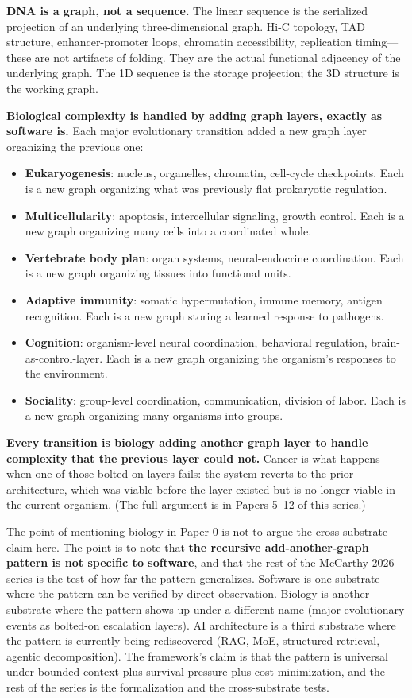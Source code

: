\documentclass[11pt]{article}
\begin{document}
\textbf{DNA is a graph, not a sequence.} The linear sequence is the serialized projection of an underlying three-dimensional graph. Hi-C topology, TAD structure, enhancer-promoter loops, chromatin accessibility, replication timing---these are not artifacts of folding. They are the actual functional adjacency of the underlying graph. The 1D sequence is the storage projection; the 3D structure is the working graph.

\textbf{Biological complexity is handled by adding graph layers, exactly as software is.} Each major evolutionary transition added a new graph layer organizing the previous one:

\begin{itemize}[leftmargin=*]
\item \textbf{Eukaryogenesis}: nucleus, organelles, chromatin, cell-cycle checkpoints. Each is a new graph organizing what was previously flat prokaryotic regulation.
\item \textbf{Multicellularity}: apoptosis, intercellular signaling, growth control. Each is a new graph organizing many cells into a coordinated whole.
\item \textbf{Vertebrate body plan}: organ systems, neural-endocrine coordination. Each is a new graph organizing tissues into functional units.
\item \textbf{Adaptive immunity}: somatic hypermutation, immune memory, antigen recognition. Each is a new graph storing a learned response to pathogens.
\item \textbf{Cognition}: organism-level neural coordination, behavioral regulation, brain-as-control-layer. Each is a new graph organizing the organism's responses to the environment.
\item \textbf{Sociality}: group-level coordination, communication, division of labor. Each is a new graph organizing many organisms into groups.
\end{itemize}

\textbf{Every transition is biology adding another graph layer to handle complexity that the previous layer could not.} Cancer is what happens when one of those bolted-on layers fails: the system reverts to the prior architecture, which was viable before the layer existed but is no longer viable in the current organism. (The full argument is in Papers 5--12 of this series.)

The point of mentioning biology in Paper 0 is not to argue the cross-substrate claim here. The point is to note that \textbf{the recursive add-another-graph pattern is not specific to software}, and that the rest of the McCarthy 2026 series is the test of how far the pattern generalizes. Software is one substrate where the pattern can be verified by direct observation. Biology is another substrate where the pattern shows up under a different name (major evolutionary events as bolted-on escalation layers). AI architecture is a third substrate where the pattern is currently being rediscovered (RAG, MoE, structured retrieval, agentic decomposition). The framework's claim is that the pattern is universal under bounded context plus survival pressure plus cost minimization, and the rest of the series is the formalization and the cross-substrate tests.
\end{document}
